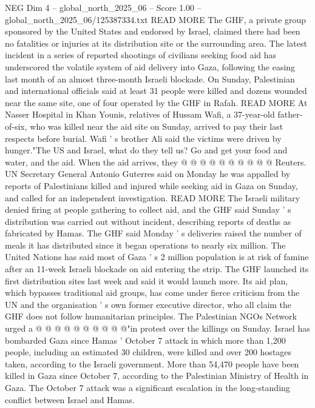 \begin{textsample}{NEG Dim 4 – global\_north\_2025\_06 – Score 1.00 – global\_north\_2025\_06/125387334.txt}  \label{ex:f4_neg_066}
READ MORE The GHF, a private group sponsored by the United States and endorsed by Israel, claimed there had been no fatalities or injuries at its distribution site or the surrounding area.
The latest incident in a series of reported shootings of civilians seeking food aid has underscored the volatile system of aid delivery into Gaza, following the easing last month of an almost three-month Israeli blockade.
On Sunday, Palestinian and international officials said at least 31 people were killed and dozens wounded near the same site, one of four operated by the GHF in Rafah.
READ MORE At Nasser Hospital in Khan Younis, relatives of Hussam Wafi, a 37-year-old father-of-six, who was killed near the aid site on Sunday, arrived to pay their last respects before burial.
Wafi ' s brother Ali said the victims were driven by hunger."The US and Israel, what do they tell us?
Go and get your food and water, and the aid.
When the aid arrives, they @ @ @ @ @ @ @ @ @ @ Reuters.
UN Secretary General Antonio Guterres said on Monday he was appalled by reports of Palestinians killed and injured while seeking aid in Gaza on Sunday, and called for an independent investigation.
READ MORE The Israeli military denied firing at people gathering to collect aid, and the GHF said Sunday ' s distribution was carried out without incident, describing reports of deaths as fabricated by Hamas.
The GHF said Monday ' s deliveries raised the number of meals it has distributed since it began operations to nearly six million.
The United Nations has said most of Gaza ' s 2 million population is at risk of famine after an 11-week Israeli blockade on aid entering the strip.
The GHF launched its first distribution sites last week and said it would launch more.
Its aid plan, which bypasses traditional aid groups, has come under fierce criticism from the UN and the organisation ' s own former executive director, who all claim the GHF does not follow humanitarian principles.
The Palestinian NGOs Network urged a @ @ @ @ @ @ @ @ @ @"in protest over the killings on Sunday.
Israel has bombarded Gaza since Hamas ' October 7 attack in which more than 1,200 people, including an estimated 30 children, were killed and over 200 hostages taken, according to the Israeli government.
More than 54,470 people have been killed in Gaza since October 7, according to the Palestinian Ministry of Health in Gaza.
The October 7 attack was a significant escalation in the long-standing conflict between Israel and Hamas.

\end{textsample}
